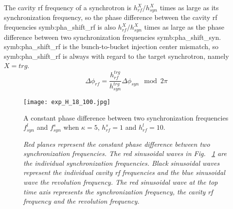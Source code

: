 The cavity rf frequency of a synchrotron is $h_{\mathit{rf}}^{X}/h_{\mathit{syn}}^{X}$ times as large as its synchronization frequency, so the phase difference between the cavity rf frequencies \gls{symb:pha_shift_rf} is also $h_{\mathit{rf}}^{X}/h_{\mathit{syn}}^{X}$ times as large as the phase difference between two synchronization frequencies \gls{symb:pha_shift_syn}. \gls{symb:pha_shift_rf} is the bunch-to-bucket injection center mismatch, so \gls{symb:pha_shift_rf} is always with regard to the target synchrotron, namely $X=trg$.
\begin{equation}
\Delta \phi_\mathit{rf}=\frac{h_{\mathit{rf}}^{trg}}{h_{\mathit{syn}}^{trg}}\Delta \phi_\mathit{syn} \mod 2\pi \label{phase_diff_rf}
\end{equation}
\begin{figure}[!htb]
   \centering   
   \texttt{[image: exp\_H\_18\_100.jpg]}
	\caption{A constant phase difference between two synchronization frequencies $f_{\mathit{syn}}^{l}$ and $f_{\mathit{syn}}^{s}$ when $\kappa=5$, $h^s_\mathit{rf}=1$ and $h^l_\mathit{rf}=10$. }

	\caption*{\textsl{\small{Red planes represent the constant phase difference between two synchronization frequencies. The red sinusoidal waves in Fig. ~\ref{exp_H_18_100} are the individual synchronization frequencies. Black sinusoidal waves represent the individual cavity rf frequencies and the blue sinusoidal wave the revolution frequency. The red sinusoidal wave at the top time axis represents the synchronization frequency, the cavity rf frequency and the revolution frequency.}}}
   \label{exp_H_18_100}
\end{figure} 


